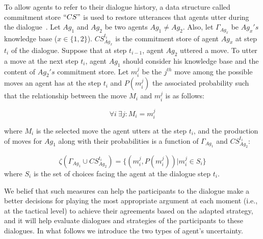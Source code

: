 To allow agents to refer to their dialogue history, a data structure called commitment store $``CS"$ is used to restore
utterances that agents utter during the dialogue~\cite{Hamblin70}.
Let $Ag_1$ and $Ag_2$ be two agents $Ag_1 \neq Ag_2$. Also, let $\Gamma_{Ag_x}$ be $Ag_x's$ knowledge base ($x \in \{1,2\}$).
$CS_{Ag_x}^{t_i}$ is the commitment store of agent $Ag_x$ at step $t_i$ of the dialogue. Suppose that at step $t_{i-1}$, agent
$Ag_2$ uttered a move. To utter a move at the next step $t_i$, agent $Ag_1$ should consider his knowledge base and the content of
$Ag_2's$ commitment store. Let $m_{i}^j$ be the $j^{th}$ move among the possible moves an agent has at the step $t_i$ and
$P(m_{i}^j)$ the associated probability such that the relationship between the move $M_i$ and $m_{i}^j$ is as follows:

\begin{equation}\label{equation3}
\forall i ~ \exists j : M_{i} = m_{i}^j
\end{equation}

where $M_{i}$ is the selected move the agent utters at the step $t_{i}$, and the production of moves for $Ag_1$ along with their
probabilities is a function of $\Gamma_{Ag_1}$ and $CS_{Ag_2}^{t_i}$:

\begin{equation}\label{equation4}
\zeta(\Gamma_ {Ag_1} \cup  CS_{Ag_2}^{t_i}) = \{(m_{i}^j , P(m_{i}^j)) | m_{i}^j\in S_{i}\}
\end{equation}
where $S_i$ is the set of choices facing the agent at the dialogue step $t_i$.

We belief that such measures can help the participants to the dialogue make a better decisions for playing the most appropriate argument at
each moment (i.e., at the tactical level) to achieve their agreements based on the adapted strategy, and it will help evaluate dialogues and strategies
of the participants to these dialogues. In what follows we introduce the two types of agent's uncertainty.



